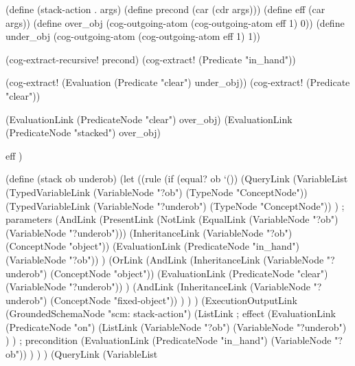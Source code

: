 \begin{python}
(define (stack-action . args)
  (define precond (car (cdr args)))
  (define eff (car args))
  (define over_obj 
    (cog-outgoing-atom (cog-outgoing-atom eff 1) 0))
  (define under_obj 
    (cog-outgoing-atom (cog-outgoing-atom eff 1) 1))

  (cog-extract-recursive! precond)
  (cog-extract! (Predicate "in_hand"))

  (cog-extract! (Evaluation (Predicate "clear") under_obj))
  (cog-extract! (Predicate "clear"))

  (EvaluationLink (PredicateNode "clear") over_obj)
  (EvaluationLink (PredicateNode "stacked") over_obj)

  eff
)

(define (stack ob underob)
  (let
    ((rule
      (if (equal? ob `())
        (QueryLink
          (VariableList
            (TypedVariableLink 
              (VariableNode "?ob") 
              (TypeNode "ConceptNode"))
            (TypedVariableLink 
              (VariableNode "?underob") 
              (TypeNode "ConceptNode"))
          ) ; parameters
          (AndLink
            (PresentLink
              (NotLink
                (EqualLink 
                  (VariableNode "?ob") 
                  (VariableNode "?underob")))
              (InheritanceLink
                (VariableNode "?ob")
                (ConceptNode "object"))
              (EvaluationLink
                (PredicateNode "in_hand")
                (VariableNode "?ob"))
            )
            (OrLink
              (AndLink
                (InheritanceLink
                  (VariableNode "?underob")
                  (ConceptNode "object"))
                (EvaluationLink
                  (PredicateNode "clear")
                  (VariableNode "?underob"))
              )
              (AndLink
                (InheritanceLink
                  (VariableNode "?underob")
                  (ConceptNode "fixed-object"))
              )
            )
          )
          (ExecutionOutputLink
            (GroundedSchemaNode "scm: stack-action")
            (ListLink
              ; effect
              (EvaluationLink
                (PredicateNode "on")
                (ListLink
                  (VariableNode "?ob")
                  (VariableNode "?underob")
                )
              )
              ; precondition
              (EvaluationLink
                (PredicateNode "in_hand")
                (VariableNode "?ob"))
            )
          )
        )
        (QueryLink
          (VariableList

\end{python}
